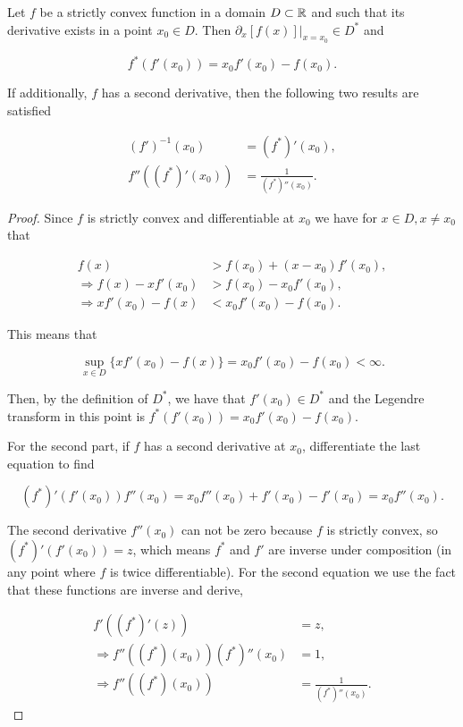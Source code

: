 \begin{lemma} \label{lemma:strictly_convex}
    Let $f$ be a strictly convex function in a domain $D \subset \mathbb R$ and such that its derivative exists in a point $x_0 \in D$. Then $\left.\partial_x [f(x)]\right|_{x=x_0} \in D^*$ and 

    \begin{equation*}
        f^*(f'(x_0)) = x_0 f'(x_0) - f(x_0).
    \end{equation*}

    If additionally, $f$ has a second derivative, then the following two results are satisfied

    \begin{align*}
        (f')^{-1}(x_0) &= (f^*)'(x_0), \\
        f''((f^*)'(x_0)) &= \frac{1}{(f^*)''(x_0)}.
    \end{align*}
\end{lemma}


\begin{proof}
    Since $f$ is strictly convex and differentiable at $x_0$ we have for $x\in D, x\neq x_0$ that 
    
    \begin{align*}
        f(x) &> f(x_0) + (x-x_0)f'(x_0), \\
        \Rightarrow f(x) -xf'(x_0) &> f(x_0) - x_0 f'(x_0),\\
        \Rightarrow xf'(x_0) - f(x) &< x_0 f'(x_0) - f(x_0).
    \end{align*}

    This means that 

    \begin{equation*}
        \sup_{x\in D}\{ xf'(x_0) - f(x) \} = x_0f'(x_0) - f(x_0) < \infty.
    \end{equation*}

    Then, by the definition of $D^*$, we have that $f'(x_0) \in D^*$ and the Legendre transform in this point is $f^*(f'(x_0)) = x_0f'(x_0) - f(x_0)$.

    For the second part, if $f$ has a second derivative at $x_0$, differentiate the last equation to find

    \begin{equation*}
        (f^*)'(f'(x_0))f''(x_0) = x_0 f''(x_0) + f'(x_0) - f'(x_0) = x_0 f''(x_0). 
    \end{equation*}

    The second derivative $f''(x_0)$ can not be zero because $f$ is strictly convex, so $(f^*)'(f'(x_0)) = z$, which means $f^*$ and $f'$ are inverse under composition (in any point where $f$ is twice differentiable). For the second equation we use the fact that these functions are inverse and derive,

    \begin{align*}
        f'((f^*)'(z)) &= z,\\
        \Rightarrow f''((f^*)(x_0))(f^*)''(x_0) &= 1,\\
        \Rightarrow f''((f^*)(x_0)) &= \frac1{(f^*)''(x_0)}.
    \end{align*}
\end{proof}

